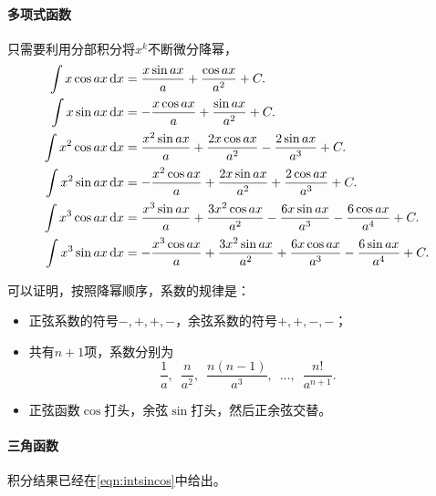 \paragraph{多项式函数}
只需要利用分部积分将$x^k$不断微分降幂，
\begin{subequations}
	\label{eq:mmp-polynomial-trigonometric-primitives}
	\begin{align}
		\int x\cos ax\mathop{}\!\mathrm{d} x &= \frac{x\sin ax}a + \frac{\cos ax}{a^2} + C.\\
		\int x\sin ax\mathop{}\!\mathrm{d} x &= -\frac{x\cos ax}a + \frac{\sin ax}{a^2} + C.\\
		\int x^2\cos ax\mathop{}\!\mathrm{d} x &= \frac{x^2\sin ax}a + \frac{2x\cos ax}{a^2} - \frac{2\sin ax}{a^3} + C.\\
		\int x^2\sin ax\mathop{}\!\mathrm{d} x &= -\frac{x^2\cos ax}a + \frac{2x\sin ax}{a^2} + \frac{2\cos ax}{a^3} + C.\\
		\int x^3\cos ax\mathop{}\!\mathrm{d} x &= \frac{x^3\sin ax}a + \frac{3x^2\cos ax}{a^2} - \frac{6x\sin ax}{a^3} - \frac{6\cos ax}{a^4} + C.\\
		\int x^3\sin ax\mathop{}\!\mathrm{d} x &= -\frac{x^3\cos ax}a + \frac{3x^2\sin ax}{a^2} + \frac{6x\cos ax}{a^3} - \frac{6\sin ax}{a^4} + C.
	\end{align}
\end{subequations}
\begin{remark}可以证明，按照降幂顺序，系数的规律是：
	\begin{itemize}
		\item 正弦系数的符号$-,+,+,-$，余弦系数的符号$+,+,-,-$；
		\item 共有$n + 1$项，系数分别为
		\[
			\frac1a,\enspace\frac n{a^2},\enspace\frac{n(n - 1)}{a^3},\enspace\ldots,\enspace\frac{n!}{a^{n+1}}.
		\]
		\item 正弦函数$\cos$打头，余弦$\sin$打头，然后正余弦交替。
	\end{itemize}
\end{remark}

\paragraph{三角函数}
积分结果已经在\eqref{eqn:intsincos}中给出。

